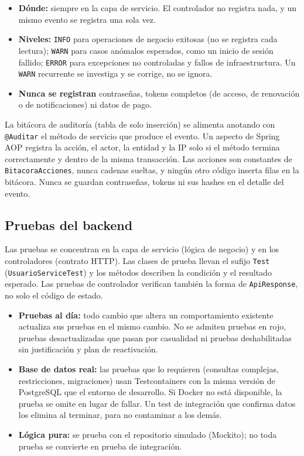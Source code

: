 \begin{itemize}
    \item \textbf{Dónde:} siempre en la capa de servicio. El controlador no registra nada, y un mismo evento se registra una sola vez.
    \item \textbf{Niveles:} \texttt{INFO} para operaciones de negocio exitosas (no se registra cada lectura); \texttt{WARN} para casos anómalos esperados, como un inicio de sesión fallido; \texttt{ERROR} para excepciones no controladas y fallos de infraestructura. Un \texttt{WARN} recurrente se investiga y se corrige, no se ignora.
    \item \textbf{Nunca se registran} contraseñas, tokens completos (de acceso, de renovación o de notificaciones) ni datos de pago.
\end{itemize}

La bitácora de auditoría (tabla de solo inserción) se alimenta anotando con \texttt{@Auditar} el método de servicio que produce el evento. Un aspecto de Spring AOP registra la acción, el actor, la entidad y la IP solo si el método termina correctamente y dentro de la misma transacción. Las acciones son constantes de \texttt{BitacoraAcciones}, nunca cadenas sueltas, y ningún otro código inserta filas en la bitácora. Nunca se guardan contraseñas, tokens ni sus hashes en el detalle del evento.

\subsection{Pruebas del backend}

Las pruebas se concentran en la capa de servicio (lógica de negocio) y en los controladores (contrato HTTP). Las clases de prueba llevan el sufijo \texttt{Test} (\texttt{UsuarioServiceTest}) y los métodos describen la condición y el resultado esperado. Las pruebas de controlador verifican también la forma de \texttt{ApiResponse}, no solo el código de estado.

\begin{itemize}
    \item \textbf{Pruebas al día:} todo cambio que altera un comportamiento existente actualiza sus pruebas en el mismo cambio. No se admiten pruebas en rojo, pruebas desactualizadas que pasan por casualidad ni pruebas deshabilitadas sin justificación y plan de reactivación.
    \item \textbf{Base de datos real:} las pruebas que lo requieren (consultas complejas, restricciones, migraciones) usan Testcontainers con la misma versión de PostgreSQL que el entorno de desarrollo. Si Docker no está disponible, la prueba se omite en lugar de fallar. Un test de integración que confirma datos los elimina al terminar, para no contaminar a los demás.
    \item \textbf{Lógica pura:} se prueba con el repositorio simulado (Mockito); no toda prueba se convierte en prueba de integración.
\end{itemize}

